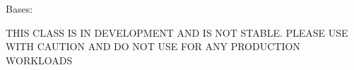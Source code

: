 \documentclass[letterpaper,10pt,english]{sphinxmanual}
\begin{document}
\begin{fulllineitems}
\label{\detokenize{aisquared.config.rendering:aisquared.config.rendering.DashboardRendering.DashboardRendering}}
\pysigstartsignatures
{}
\pysigstopsignatures
\sphinxAtStartPar
Bases: {\hyperref[\detokenize{aisquared.base:aisquared.base.BaseObject.BaseObject}]{}}

\sphinxAtStartPar
THIS CLASS IS IN DEVELOPMENT AND IS NOT STABLE. PLEASE USE WITH CAUTION AND DO NOT USE FOR ANY PRODUCTION WORKLOADS


\end{fulllineitems}
\end{document}
